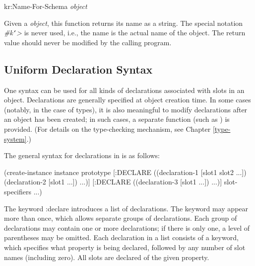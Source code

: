 \value{f-top}
\begin{example}
kr:Name-For-Schema {\it object}\value{function}
\end{example}

Given a {\it object}, this function returns its name as a string.  The
special notation {\it \#k{\tt\char`\<}>} is never used, i.e., the name is the actual name
of the object.  The return value should never be modified by the calling
program.



\begin{group}
\section{Uniform Declaration Syntax}
\label{uniform-syntax}
 

One syntax can be used for all kinds of declarations
associated with slots in an object.  Declarations are generally specified at
object creation time.  In some
cases (notably, in the case of types), it is also meaningful to
modify declarations after an object has been created; in such cases, a
separate function (such as ) is provided.  (For details on the
type-checking mechanism, see Chapter \ref{type-system}.)
\end{group}
\vspace{1 line}

\begin{group}
The general syntax for declarations in  is as follows:
\begin{programexample}
(create-instance instance prototype
  [:DECLARE ((declaration-1 [slot1 slot2 ...])
             (declaration-2 [slot1 ...])
             ...)]
  [:DECLARE ((declaration-3 [slot1 ...])
            ...)]
  slot-specifiers ...)
\end{programexample}
\end{group}
\vspace{1 line}

The keyword {\sc :declare} introduces a list of declarations.  The
keyword may appear more than once, which allows separate groups of
declarations.  Each group of declarations may contain one or more
declarations; if there is only one, a level of parentheses may be
omitted.  Each declaration in a list consists of a keyword, which
specifies what property is being declared, followed by any number of
slot names (including zero).  All slots are declared of the given
property.

